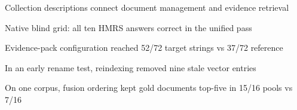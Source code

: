 \begin{highlights}
\item Collection descriptions connect document management and evidence retrieval
\item Native blind grid: all ten HMRS answers correct in the unified pass
\item Evidence-pack configuration reached 52/72 target strings vs 37/72 reference
\item In an early rename test, reindexing removed nine stale vector entries
\item On one corpus, fusion ordering kept gold documents top-five in 15/16 pools vs 7/16
\end{highlights}

